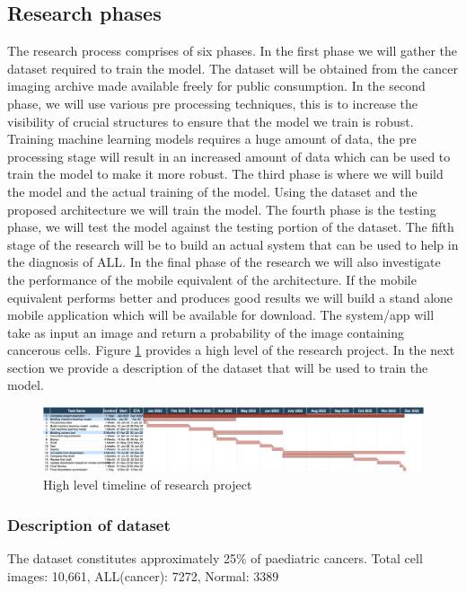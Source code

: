\documentclass[a4paper,11pt]{article}
\begin{document}
\subsection{Research phases}
\label{phases}
The research process comprises of six phases. In the first phase we will gather the dataset required to train the model. The dataset will be obtained from the cancer imaging archive made available freely for public consumption. In the second phase, we will use various pre processing techniques, this is to increase the visibility of crucial structures to ensure that the model we train is robust. Training machine learning models requires a huge amount of data, the pre processing stage will result in an increased amount of data which can be used to train the model to make it more robust. The third phase is where we will build the model and the actual training of the model. Using the dataset and the proposed architecture we will train the model. The fourth phase is the testing phase, we will test the model against the testing portion of the dataset. The fifth stage of the research will be to build an actual system that can be used to help in the diagnosis of ALL. In the final phase of the research we will also investigate the performance of the mobile equivalent of the architecture. If the mobile equivalent performs better and produces good results we will build a stand alone mobile application which will be available for download. The system/app will take as input an image and return a probability of the image containing cancerous cells. Figure \ref{fig: timeline} provides a high level of the research project. 
 In the next section we provide a description of the dataset that will be used to train the model.

\begin{figure}[!htbp]
\includegraphics[scale=0.17]{Timeline.jpeg} 
\caption{High level timeline of research project}
\label{fig: timeline}
\end{figure}

\subsubsection{Description of dataset}
\label{dataset}
The dataset constitutes approximately 25\% of paediatric cancers. Total cell images: 10,661, ALL(cancer): 7272, Normal: 3389
\end{document}
